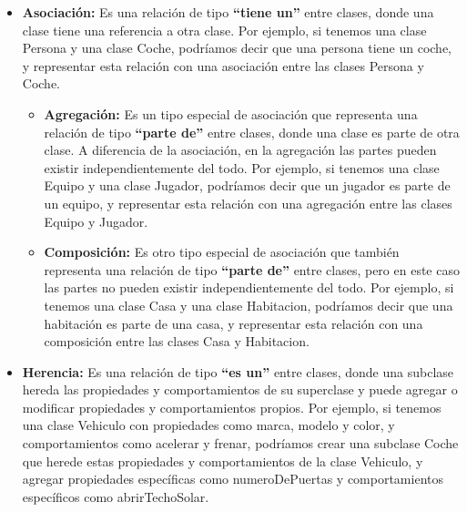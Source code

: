 \documentclass[../main.tex]{subfiles}
\begin{document}
        \newpage
        \begin{itemize}
            \item \textbf{Asociación:} Es una relación de tipo \textbf{“tiene un”} entre clases, donde una clase tiene una referencia a otra clase. Por ejemplo, si tenemos una clase Persona y una clase Coche, podríamos decir que una persona tiene un coche, y representar esta relación con una asociación entre las clases Persona y Coche.
                \begin{itemize}
                    \item \textbf{Agregación:} Es un tipo especial de asociación que representa una relación de tipo \textbf{“parte de”} entre clases, donde una clase es parte de otra clase. A diferencia de la asociación, en la agregación las partes pueden existir independientemente del todo. Por ejemplo, si tenemos una clase Equipo y una clase Jugador, podríamos decir que un jugador es parte de un equipo, y representar esta relación con una agregación entre las clases Equipo y Jugador.
                        
                    \item \textbf{Composición:}  Es otro tipo especial de asociación que también representa una relación de tipo \textbf{“parte de”} entre clases, pero en este caso las partes no pueden existir independientemente del todo. Por ejemplo, si tenemos una clase Casa y una clase Habitacion, podríamos decir que una habitación es parte de una casa, y representar esta relación con una composición entre las clases Casa y Habitacion.
                            
                \end{itemize}
            \item \textbf{Herencia:} Es una relación de tipo \textbf{“es un”} entre clases, donde una subclase hereda las propiedades y comportamientos de su superclase y puede agregar o modificar propiedades y comportamientos propios. Por ejemplo, si tenemos una clase Vehiculo con propiedades como marca, modelo y color, y comportamientos como acelerar y frenar, podríamos crear una subclase Coche que herede estas propiedades y comportamientos de la clase Vehiculo, y agregar propiedades específicas como numeroDePuertas y comportamientos específicos como abrirTechoSolar.
            

\end{itemize}
\end{document}
